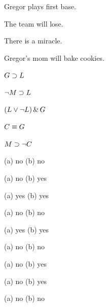 \begin{ekey}
\item[G:] Gregor plays first base.
\item[L:] The team will lose.
\item[M:] There is a miracle.
\item[C:] Gregor's mom will bake cookies.
\end{ekey}
\begin{earg}
\item %
$G \supset L$
\item %
$\neg M \supset L$
\item %
$(L \vee \neg L) \,\&\, G$
\item %
$C \equiv G$
\item %
$M \supset \neg C$
\end{earg}

\begin{earg}
\item %
(a) no (b) no
\item %
(a) no (b) yes
\item %
(a) yes (b) yes
\item %
(a) no (b) no
\item %
(a) yes (b) yes
\item %
(a) no (b) no
\item %
(a) no (b) yes
\item %
(a) no (b) yes
\item %
(a) no (b) no
\end{earg}


